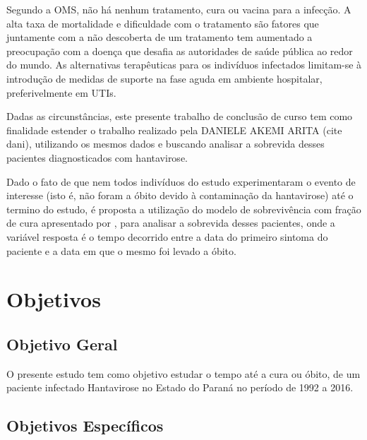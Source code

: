 \documentclass[
	12pt,				%
	openright,			%
	oneside,			%
	a4paper,			%
	brazil				%
	]{abntex2}
\begin{document}
Segundo a OMS, não há nenhum tratamento, cura ou vacina para a infecção. A alta taxa de mortalidade e dificuldade com o tratamento são fatores que juntamente com a não descoberta de um tratamento tem aumentado a preocupação com a doença que desafia as autoridades de saúde pública ao redor do mundo. As alternativas terapêuticas para os indivíduos infectados limitam-se à introdução de medidas de suporte na fase aguda em ambiente hospitalar, preferivelmente em UTIs.

Dadas as circunstâncias, este presente trabalho de conclusão de curso tem como finalidade estender o trabalho realizado pela DANIELE AKEMI ARITA (cite dani), utilizando os mesmos dados e buscando analisar a sobrevida desses pacientes diagnosticados com hantavirose.

Dado o fato de que nem todos indivíduos do estudo experimentaram o evento de interesse (isto é, não foram a óbito devido à contaminação da hantavirose) até o termino do estudo, é proposta a utilização do modelo de sobrevivência com fração de cura apresentado por , para analisar a sobrevida desses pacientes, onde a variável resposta é o tempo decorrido entre a data do primeiro sintoma do paciente e a data em que o mesmo foi levado a óbito.

\hypertarget{objetivos}{%
\chapter{Objetivos}\label{objetivos}}

\bigskip

\hypertarget{objetivo-geral}{%
\section{Objetivo Geral}\label{objetivo-geral}}

O presente estudo tem como objetivo estudar o tempo até a cura ou óbito, de um paciente infectado Hantavirose no Estado do Paraná no período de 1992 a 2016.

\hypertarget{objetivos-especuxedficos}{%
\section{Objetivos Específicos}\label{objetivos-especuxedficos}}
\end{document}
